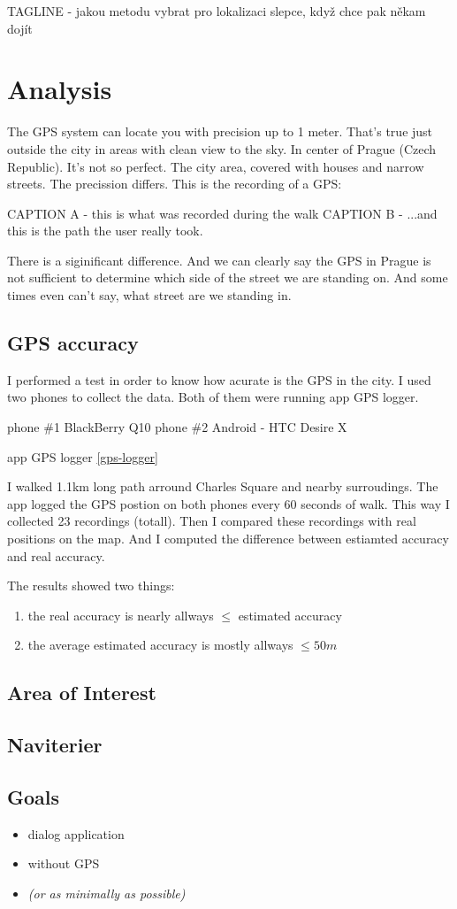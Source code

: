 TAGLINE - jakou metodu vybrat pro lokalizaci slepce, když chce pak někam dojít
	\chapter{Analysis}
	The GPS system can locate you with precision up to 1 meter. That's true just outside the city in areas with clean view to the sky. In center of Prague (Czech Republic). It's not so perfect. The city area, covered with houses and narrow streets. The precission differs.
	This is the recording of a GPS:
	
	CAPTION A - this is what was recorded during the walk
	CAPTION B - ...and this is the path the user really took.
	
	There is a siginificant difference. And we can clearly say the GPS in Prague is not sufficient to determine which side of the street we are standing on.
	 And some times even can't say, what street are we standing in.
	
	\section{GPS accuracy}
	I performed a test in order to know how acurate is the GPS in the city. I used two phones to collect the data. Both of them were running app GPS logger.
	
	phone \#1  BlackBerry Q10
	phone \#2  Android - HTC Desire X
	
	app		GPS logger \ref{gps-logger}
	
	I walked 1.1km long path arround Charles Square and nearby surroudings. The app logged the GPS postion on both phones every 60 seconds of walk. This way I collected 23 recordings (totall). Then I compared these recordings with real positions on the map. And I computed the difference between estiamted accuracy and real accuracy.
	
	
	The results showed two things:
	\begin{enumerate}
		\item the real accuracy is nearly allways $\leq$ estimated accuracy
		\item the average estimated accuracy is mostly allways $\leq 50m$
	\end{enumerate}
	
	
	
	
	\section{Area of Interest}
	
	\section{Naviterier}
	
	\section{Goals}
		\begin{itemize}
			\item dialog application
			\item without GPS
			\item \emph{ (or as minimally as possible)}
		\end{itemize}